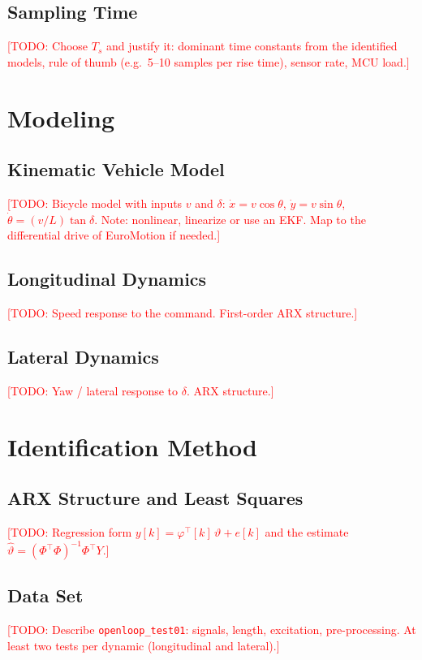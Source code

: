 \documentclass[conference]{IEEEtran}
\newcommand{\todo}[1]{\textcolor{red}{[TODO: #1]}}
\begin{document}
\subsection{Sampling Time}\label{sec:ts}
\todo{Choose $T_s$ and justify it: dominant time constants from the
identified models, rule of thumb (e.g.\ 5--10 samples per rise time),
sensor rate, MCU load.}

\section{Modeling}

\subsection{Kinematic Vehicle Model}
\todo{Bicycle model with inputs $v$ and $\delta$:
$\dot{x} = v\cos\theta$, $\dot{y} = v\sin\theta$,
$\dot{\theta} = (v/L)\tan\delta$. Note: nonlinear, linearize or use an
EKF. Map to the differential drive of EuroMotion if needed.}

\subsection{Longitudinal Dynamics}
\todo{Speed response to the command. First-order ARX structure.}

\subsection{Lateral Dynamics}
\todo{Yaw / lateral response to $\delta$. ARX structure.}

\section{Identification Method}

\subsection{ARX Structure and Least Squares}
\todo{Regression form $y[k] = \varphi^\top[k]\,\vartheta + e[k]$ and the
estimate $\hat{\vartheta} = (\Phi^\top\Phi)^{-1}\Phi^\top Y$.}

\subsection{Data Set}
\todo{Describe \texttt{openloop\_test01}: signals, length, excitation,
pre-processing. At least two tests per dynamic (longitudinal and lateral).}
\end{document}
